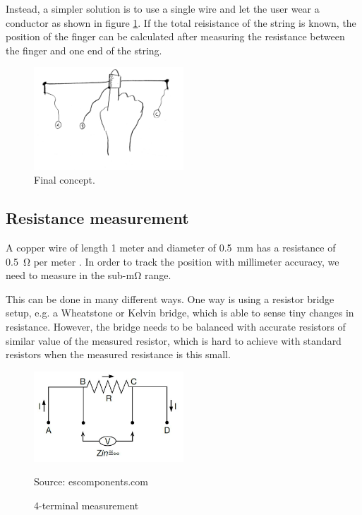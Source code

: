 \documentclass{article}
\newcommand{\source}[1]{\hfill \vspace{-15pt} \caption*{ \footnotesize Source: {#1}} }
\begin{document}
Instead, a simpler solution is to use a single wire and let the user wear a conductor as shown in figure \ref{fig:slidarr_final_concept}. If the total reisistance of the string is known, the position of the finger can be calculated after measuring the resistance between the finger and one end of the string.

\begin{figure}[h]
  \centering
  \includegraphics[width=0.5\textwidth]{slidarr_final_concept}
  \caption{Final concept.}
  \label{fig:slidarr_final_concept}
\end{figure}

\subsection{Resistance measurement} \label{sec:resistance_measurement}
A copper wire of length 1 meter and diameter of \SI{0.5}{mm} has a resistance of \SI{0.5}{\ohm} per meter \cite{copperresistance}. In order to track the position  with millimeter accuracy, we need to measure in the sub-\si{\milli\ohm} range. 

This can be done in many different ways. One way is using a resistor bridge setup, e.g. a Wheatstone or Kelvin bridge, which is able to sense tiny changes in resistance. However, the bridge needs to be balanced with accurate resistors of similar value of the measured resistor, which is hard to achieve with standard resistors when the measured resistance is this small.

\begin{figure}[ht]
  \centering
  \includegraphics[width=0.5\textwidth]{Kelvin_Connections}
  \caption{4-terminal measurement}
  \source{escomponents.com}
  \label{fig:4terminal}
\end{figure}
\end{document}
